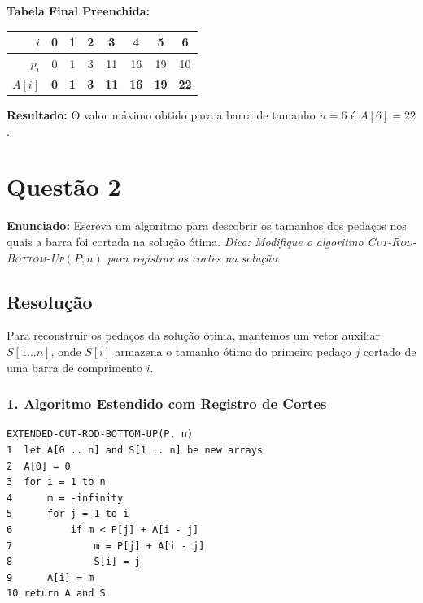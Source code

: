 \documentclass[11pt,a4paper]{article}
\begin{document}
\textbf{Tabela Final Preenchida:}
\begin{center}
\begin{tabular}{r|ccccccc}
\toprule
$i$ & 0 & 1 & 2 & 3 & 4 & 5 & 6 \\
\midrule
$p_i$ & 0 & 1 & 3 & 11 & 16 & 19 & 10 \\
$A[i]$ & \textbf{0} & \textbf{1} & \textbf{3} & \textbf{11} & \textbf{16} & \textbf{19} & \textbf{22} \\
\bottomrule
\end{tabular}
\end{center}

\textbf{Resultado:} O valor máximo obtido para a barra de tamanho $n = 6$ é $A[6] = 22$.

\vspace{0.4cm}

\section*{Questão 2}
\textbf{Enunciado:} Escreva um algoritmo para descobrir os tamanhos dos pedaços nos quais a barra foi cortada na solução ótima. \emph{Dica: Modifique o algoritmo \textsc{Cut-Rod-Bottom-Up}$(P, n)$ para registrar os cortes na solução.}

\subsection*{Resolução}

Para reconstruir os pedaços da solução ótima, mantemos um vetor auxiliar $S[1 \dots n]$, onde $S[i]$ armazena o tamanho ótimo do primeiro pedaço $j$ cortado de uma barra de comprimento $i$.

\subsubsection*{1. Algoritmo Estendido com Registro de Cortes}

\begin{lstlisting}
EXTENDED-CUT-ROD-BOTTOM-UP(P, n)
1  let A[0 .. n] and S[1 .. n] be new arrays
2  A[0] = 0
3  for i = 1 to n
4      m = -infinity
5      for j = 1 to i
6          if m < P[j] + A[i - j]
7              m = P[j] + A[i - j]
8              S[i] = j
9      A[i] = m
10 return A and S
\end{lstlisting}
\end{document}
